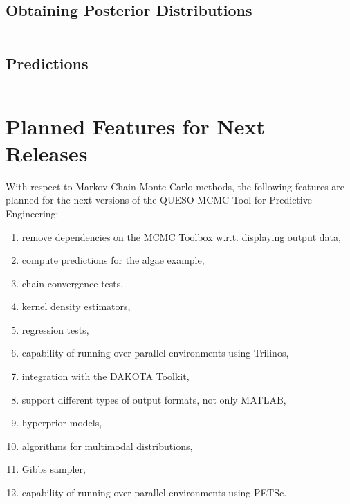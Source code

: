 \subsection{Obtaining Posterior Distributions}
$~$\\

\subsection{Predictions}
$~$\\

\clearpage

\section{Planned Features for Next Releases}\label{sc-gmc-planned-features}
With respect to Markov Chain Monte Carlo methods, the following features are planned for the next versions of the QUESO-MCMC Tool for Predictive Engineering:
\begin{enumerate}
\item remove dependencies on the MCMC Toolbox w.r.t. displaying output data,
\item compute predictions for the algae example,
\item chain convergence tests,
\item kernel density estimators,
\item regression tests,
\item capability of running over parallel environments using Trilinos,
\item integration with the DAKOTA Toolkit,
\item support different types of output formats, not only MATLAB,
\item hyperprior models,
\item algorithms for multimodal distributions,
\item Gibbs sampler,
\item capability of running over parallel environments using PETSc.
\end{enumerate}
 
